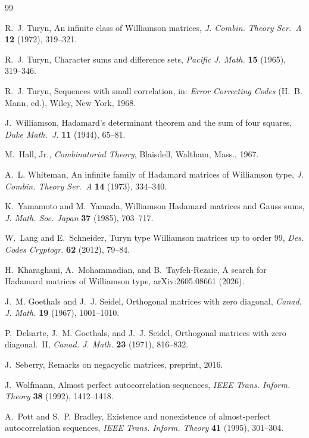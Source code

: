 \documentclass[11pt]{article}
\theoremstyle{plain}
\theoremstyle{definition}
\theoremstyle{remark}
\begin{document}
\begin{thebibliography}{99}

 R.~J. Turyn, An infinite class of Williamson matrices,
\emph{J. Combin. Theory Ser.~A} \textbf{12} (1972), 319--321.

 R.~J. Turyn, Character sums and difference sets,
\emph{Pacific J. Math.} \textbf{15} (1965), 319--346.

 R.~J. Turyn, Sequences with small correlation, in:
\emph{Error Correcting Codes} (H.~B. Mann, ed.), Wiley, New York, 1968.

 J.~Williamson, Hadamard's determinant theorem and the
sum of four squares, \emph{Duke Math.~J.} \textbf{11} (1944), 65--81.

 M.~Hall, Jr., \emph{Combinatorial Theory}, Blaisdell, Waltham,
Mass., 1967.

 A.~L. Whiteman, An infinite family of Hadamard matrices of
Williamson type, \emph{J. Combin. Theory Ser.~A} \textbf{14} (1973), 334--340.

 K.~Yamamoto and M.~Yamada, Williamson Hadamard matrices and Gauss
sums, \emph{J. Math. Soc. Japan} \textbf{37} (1985), 703--717.

 W.~Lang and E.~Schneider, Turyn type Williamson matrices up to
order 99, \emph{Des. Codes Cryptogr.} \textbf{62} (2012), 79--84.

 H.~Kharaghani, A.~Mohammadian, and B.~Tayfeh-Rezaie, A search
for Hadamard matrices of Williamson type, arXiv:2605.08661 (2026).

 J.~M. Goethals and J.~J. Seidel, Orthogonal matrices with zero
diagonal, \emph{Canad. J. Math.} \textbf{19} (1967), 1001--1010.

 P.~Delsarte, J.~M. Goethals, and J.~J. Seidel, Orthogonal
matrices with zero diagonal.~II, \emph{Canad. J. Math.} \textbf{23} (1971),
816--832.

 J.~Seberry, Remarks on negacyclic matrices, preprint, 2016.

 J.~Wolfmann, Almost perfect autocorrelation sequences,
\emph{IEEE Trans. Inform. Theory} \textbf{38} (1992), 1412--1418.

 A.~Pott and S.~P. Bradley, Existence and nonexistence of
almost-perfect autocorrelation sequences, \emph{IEEE Trans. Inform. Theory}
\textbf{41} (1995), 301--304.


\end{thebibliography}
\end{document}
